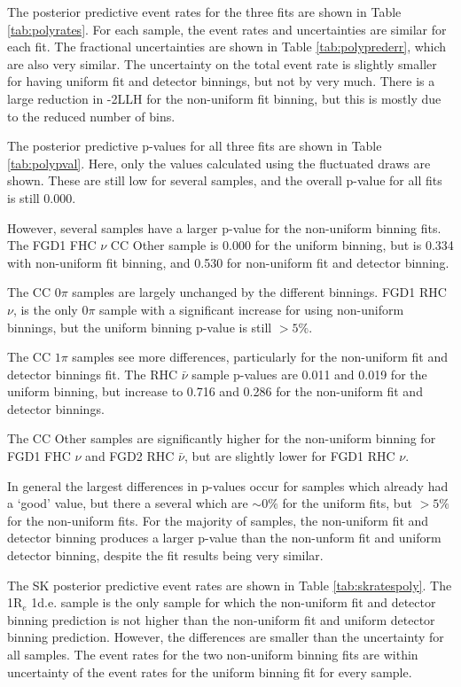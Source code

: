 The posterior predictive event rates for the three fits are shown in Table \ref{tab:polyrates}. For each sample, the event rates and uncertainties are similar for each fit. The fractional uncertainties are shown in Table \ref{tab:polyprederr}, which are also very similar. The uncertainty on the total event rate is slightly smaller for having uniform fit and detector binnings, but not by very much. There is a large reduction in -2LLH for the non-uniform fit binning, but this is mostly due to the reduced number of bins.

The posterior predictive p-values for all three fits are shown in Table \ref{tab:polypval}. Here, only the values calculated using the fluctuated draws are shown. These are still low for several samples, and the overall p-value for all fits is still 0.000. 

However, several samples have a larger p-value for the non-uniform binning fits. The FGD1 FHC $\nu$ CC Other sample is 0.000 for the uniform binning, but is 0.334 with non-uniform fit binning, and 0.530 for non-uniform fit and detector binning. 

The CC $0\pi$ samples are largely unchanged by the different binnings. FGD1 RHC $\nu$, is the only 0$\pi$ sample with a significant increase for using non-uniform binnings, but the uniform binning p-value is still $>5\%$.

The CC $1\pi$ samples see more differences, particularly for the non-uniform fit and detector binnings fit. The RHC $\bar{\nu}$ sample p-values are 0.011 and 0.019 for the uniform binning, but increase to 0.716 and 0.286 for the non-uniform fit and detector binnings. 

The CC Other samples are significantly higher for the non-uniform binning for FGD1 FHC $\nu$ and FGD2 RHC $\bar{\nu}$, but are slightly lower for FGD1 RHC $\nu$. 

In general the largest differences in p-values occur for samples which already had a `good' value, but there a several which are $\sim0\%$ for the uniform fits, but $>5\%$ for the non-uniform fits. For the majority of samples, the non-uniform fit and detector binning produces a larger p-value than the non-unform fit and uniform detector binning, despite the fit results being very similar. 

The SK posterior predictive event rates are shown in Table \ref{tab:skratespoly}. The 1R$_{e}$ 1d.e. sample is the only sample for which the non-uniform fit and detector binning prediction is not higher than the non-uniform fit and uniform detector binning prediction. However, the differences are smaller than the uncertainty for all samples. The event rates for the two non-uniform binning fits are within uncertainty of the event rates for the uniform binning fit for every sample.

